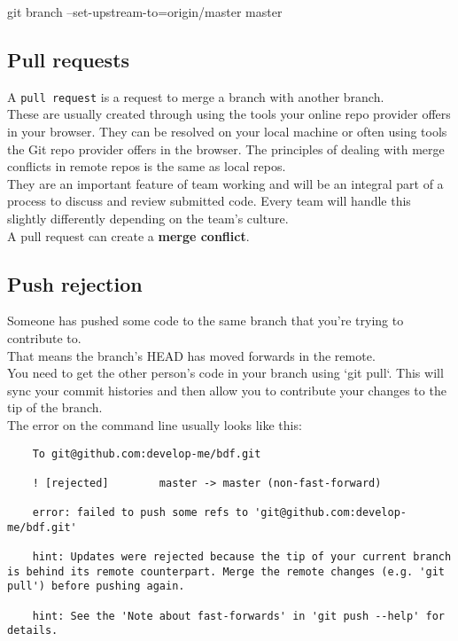 git branch --set-upstream-to=origin/master master


\subsection{Pull requests}

A \texttt{pull request} is a request to merge a branch with another branch.
\\

These are usually created through using the tools your online repo provider offers in your browser. They can be resolved on your local machine or often using tools the Git repo provider offers in the browser. The principles of dealing with merge conflicts in remote repos is the same as local repos.
\\

They are an important feature of team working and will be an integral part of a process to discuss and review submitted code. Every team will handle this slightly differently depending on the team's culture.
\\

A pull request can create a \textbf{merge conflict}.


\subsection{Push rejection}

Someone has pushed some code to the same branch that you’re trying to contribute to.
\\

That means the branch’s HEAD has moved forwards in the remote.
\\

You need to get the other person's code in your branch using `git pull`. This will sync your commit histories and then allow you to contribute your changes to the tip of the branch.
\\

The error on the command line usually looks like this:

\begin{verbatim}
    To git@github.com:develop-me/bdf.git

    ! [rejected]        master -> master (non-fast-forward)

    error: failed to push some refs to 'git@github.com:develop-me/bdf.git'

    hint: Updates were rejected because the tip of your current branch is behind its remote counterpart. Merge the remote changes (e.g. 'git pull') before pushing again.

    hint: See the 'Note about fast-forwards' in 'git push --help' for details.
\end{verbatim}


